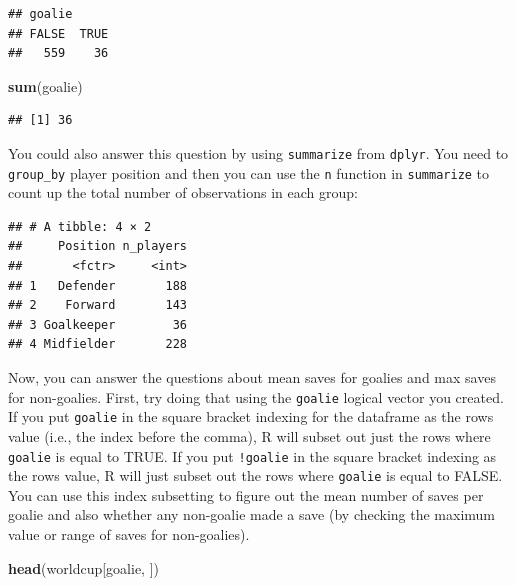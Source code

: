 \documentclass[]{book}
\makeatletter
\newenvironment{Shaded}{\begin{snugshade}}{\end{snugshade}}
\newcommand{\KeywordTok}[1]{\textcolor[rgb]{0.13,0.29,0.53}{\textbf{{#1}}}}
\newcommand{\DataTypeTok}[1]{\textcolor[rgb]{0.13,0.29,0.53}{{#1}}}
\newcommand{\StringTok}[1]{\textcolor[rgb]{0.31,0.60,0.02}{{#1}}}
\newcommand{\NormalTok}[1]{{#1}}
\newenvironment{kframe}{%
\medskip{}
\setlength{\fboxsep}{.8em}
 \def\at@end@of@kframe{}%
 \ifinner\ifhmode%
  \def\at@end@of@kframe{\end{minipage}}%
  \begin{minipage}{\columnwidth}%
 \fi\fi%
 \def\FrameCommand##1{\hskip\@totalleftmargin \hskip-\fboxsep
 \colorbox{shadecolor}{##1}\hskip-\fboxsep
     \hskip-\linewidth \hskip-\@totalleftmargin \hskip\columnwidth}%
 \MakeFramed {\advance\hsize-\width
   \@totalleftmargin\z@ \linewidth\hsize
   \@setminipage}}%
 {\par\unskip\endMakeFramed%
 \at@end@of@kframe}
\renewenvironment{Shaded}{\begin{kframe}}{\end{kframe}}
\makeatother
\begin{document}
\begin{verbatim}
## goalie
## FALSE  TRUE 
##   559    36
\end{verbatim}

\begin{Shaded}
\begin{Highlighting}[]
\KeywordTok{sum}\NormalTok{(goalie)}
\end{Highlighting}
\end{Shaded}

\begin{verbatim}
## [1] 36
\end{verbatim}

You could also answer this question by using \texttt{summarize} from
\texttt{dplyr}. You need to \texttt{group\_by} player position and then
you can use the \texttt{n} function in \texttt{summarize} to count up
the total number of observations in each group:

\begin{Shaded}
\end{Shaded}

\begin{verbatim}
## # A tibble: 4 × 2
##     Position n_players
##       <fctr>     <int>
## 1   Defender       188
## 2    Forward       143
## 3 Goalkeeper        36
## 4 Midfielder       228
\end{verbatim}

Now, you can answer the questions about mean saves for goalies and max
saves for non-goalies. First, try doing that using the \texttt{goalie}
logical vector you created. If you put \texttt{goalie} in the square
bracket indexing for the dataframe as the rows value (i.e., the index
before the comma), R will subset out just the rows where \texttt{goalie}
is equal to TRUE. If you put \texttt{!goalie} in the square bracket
indexing as the rows value, R will just subset out the rows where
\texttt{goalie} is equal to FALSE. You can use this index subsetting to
figure out the mean number of saves per goalie and also whether any
non-goalie made a save (by checking the maximum value or range of saves
for non-goalies).

\begin{Shaded}
\begin{Highlighting}[]
\KeywordTok{head}\NormalTok{(worldcup[goalie, ])}
\end{Highlighting}
\end{Shaded}
\end{document}
